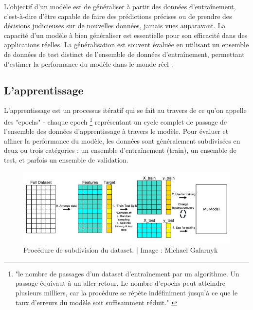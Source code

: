 L'objectif d'un modèle est de généraliser à partir des données d'entraînement, c'est-à-dire d'être capable de faire des prédictions précises ou de prendre des décisions judicieuses sur de nouvelles données, jamais vues auparavant. La capacité d'un modèle à bien généraliser est essentielle pour son efficacité dans des applications réelles. La généralisation est souvent évaluée en utilisant un ensemble de données de test distinct de l'ensemble de données d'entraînement, permettant d'estimer la performance du modèle dans le monde réel \cite{Bonaccorso_2018, Deisenroth_Faisal_Ong_2020}.

\subsection{L'apprentissage}

L'apprentissage est un processus itératif qui se fait au travers de ce qu'on appelle des "epochs" - chaque epoch \footnote{"le nombre de passages d'un dataset d'entraînement par un algorithme. Un passage équivaut à un aller-retour. Le nombre d'epochs peut atteindre plusieurs milliers, car la procédure se répète indéfiniment jusqu'à ce que le taux d'erreurs du modèle soit suffisamment réduit." \cite{Kassel_2023}} représentant un cycle complet de passage de l'ensemble des données d'apprentissage à travers le modèle. Pour évaluer et affiner la performance du modèle, les données sont généralement subdivisées en deux ou trois catégories : un ensemble d'entraînement (train), un ensemble de test, et parfois un ensemble de validation. 

\begin{figure}[H]
    \centering
    \includegraphics[width=15cm]{gfx/fig-dataset-split.jpg}
    \caption{
       Procédure de subdivision du dataset. | Image : Michael Galarnyk
    }
    \label{fig:mlprocess}
\end{figure}

